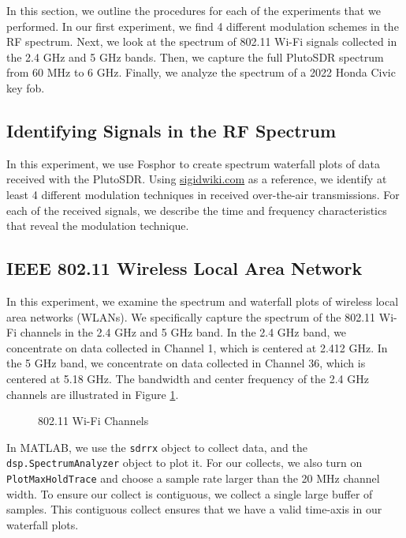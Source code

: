\documentclass{article}
\begin{document}
In this section, we outline the procedures for each of the experiments that we performed. In our first experiment, we find 4 different modulation schemes in the RF spectrum. Next, we look at the spectrum of 802.11 Wi-Fi signals collected in the 2.4 GHz and 5 GHz bands. Then, we capture the full PlutoSDR spectrum from 60 MHz to 6 GHz. Finally, we analyze the spectrum of a 2022 Honda Civic key fob.

\subsection{Identifying Signals in the RF Spectrum}

In this experiment, we use Fosphor to create spectrum waterfall plots of data received with the PlutoSDR. Using \url{sigidwiki.com} as a reference, we identify at least 4 different modulation techniques in received over-the-air transmissions. For each of the received signals, we describe the time and frequency characteristics that reveal the modulation technique.

\subsection{IEEE 802.11 Wireless Local Area Network}

In this experiment, we examine the spectrum and waterfall plots of wireless local area networks (WLANs). We specifically capture the spectrum of the 802.11 Wi-Fi channels in the 2.4 GHz and 5 GHz band. In the 2.4 GHz band, we concentrate on data collected in Channel 1, which is centered at 2.412 GHz. In the 5 GHz band, we concentrate on data collected in Channel 36, which is centered at 5.18 GHz. The bandwidth and center frequency of the 2.4 GHz channels are illustrated in Figure \ref{fig::802_11_channels}.

\begin{figure}[H]
	\centerline{}
	\caption{802.11 Wi-Fi Channels}
	\label{fig::802_11_channels}
\end{figure}

In MATLAB, we use the \texttt{sdrrx} object to collect data, and the \texttt{dsp.SpectrumAnalyzer} object to plot it. For our collects, we also turn on \texttt{PlotMaxHoldTrace} and choose a sample rate larger than the 20 MHz channel width. To ensure our collect is contiguous, we collect a single large buffer of samples. This contiguous collect ensures that we have a valid time-axis in our waterfall plots.
 
\end{document}
